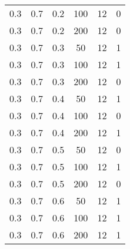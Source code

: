 \begin{table}[h]
\begin{center}
\begin{tabular}{|c|c|c|c|c|c|}
	0.3 &  0.7 &  0.2 &  100 &    12 &     0 \\
	0.3 &  0.7 &  0.2 &  200 &    12 &     0 \\
   \hline
	0.3 &  0.7 &  0.3 &   50 &    12 &     1 \\
	0.3 &  0.7 &  0.3 &  100 &    12 &     1 \\
	0.3 &  0.7 &  0.3 &  200 &    12 &     0 \\
   \hline
	0.3 &  0.7 &  0.4 &   50 &    12 &     1 \\
	0.3 &  0.7 &  0.4 &  100 &    12 &     0 \\
	0.3 &  0.7 &  0.4 &  200 &    12 &     1 \\
   \hline
	0.3 &  0.7 &  0.5 &   50 &    12 &     0 \\
	0.3 &  0.7 &  0.5 &  100 &    12 &     1 \\
	0.3 &  0.7 &  0.5 &  200 &    12 &     0 \\
   \hline
	0.3 &  0.7 &  0.6 &   50 &    12 &     1 \\
	0.3 &  0.7 &  0.6 &  100 &    12 &     1 \\
	0.3 &  0.7 &  0.6 &  200 &    12 &     1 \\
   \hline
    		\end{tabular}
	\end{center}
\end{table}
